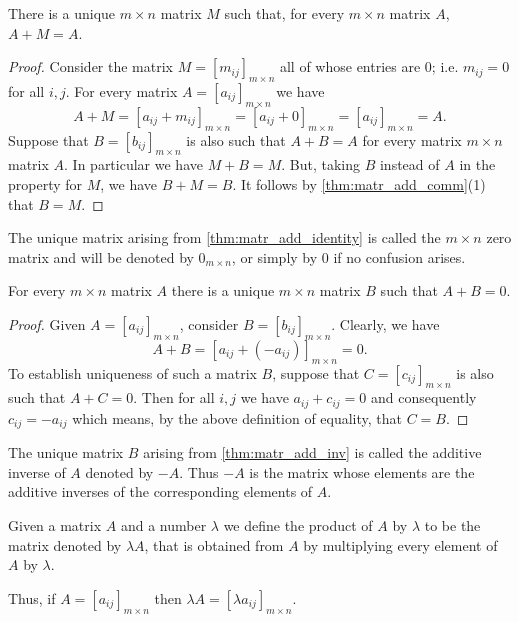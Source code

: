 \documentclass[10pt, a4paper]{article}
\begin{document}
\begin{theorem}\label{thm:matr_add_identity}
    There is a unique $m\times n$ matrix $M$ such that, for every $m\times n$ matrix $A$, $A + M = A$.
    \begin{proof}
        Consider the matrix $M = [m_{ij}]_{m\times n}$ all of whose entries are $0$; i.e. $m_{ij} = 0$ for all $i, j$. For every matrix $A = [a_{ij}]_{m\times n}$ we have
        \[
        A + M = [a_{ij} + m_{ij}]_{m\times n} = [a_{ij} + 0]_{m\times n} = [a_{ij}]_{m\times n} = A.
        \]
        Suppose that $B = [b_{ij}]_{m\times n}$ is also such that $A + B = A$ for every matrix $m\times n$ matrix $A$. In particular we have $M + B = M$. But, taking $B$ instead of $A$ in the property for $M$, we have $B + M = B$. It follows by \autoref{thm:matr_add_comm}(1) that $B = M$.
    \end{proof}
\end{theorem}

\begin{definition}
    The unique matrix arising from \autoref{thm:matr_add_identity} is called the $m\times n$ zero matrix and will be denoted by $0_{m\times n}$, or simply by $0$ if no confusion arises.
\end{definition}

\begin{theorem}\label{thm:matr_add_inv}
    For every $m\times n$ matrix $A$ there is a unique $m\times n$ matrix $B$ such that $A + B = 0$.

    \begin{proof}
        Given $A = [a_{ij}]_{m\times n}$, consider $B = [b_{ij}]_{m\times n}$. Clearly, we have
        \[
        A + B = [a_{ij} + (-a_{ij})]_{m\times n} = 0.
        \]
        To establish uniqueness of such a matrix $B$, suppose that $C = [c_{ij}]_{m\times n}$ is also such that $A + C = 0$. Then for all $i, j$ we have $a_{ij} + c_{ij} = 0$ and consequently $c_{ij} = -a_{ij}$ which means, by the above definition of equality, that $C = B$.
    \end{proof}
\end{theorem}

\begin{definition}
    The unique matrix $B$ arising from \autoref{thm:matr_add_inv} is called the additive inverse of $A$ denoted by $-A$. Thus $-A$ is the matrix whose elements are the additive inverses of the corresponding elements of $A$.
\end{definition}

\begin{definition}
    Given a matrix $A$ and a number $\lambda$ we define the product of $A$ by $\lambda$ to be the matrix denoted by $\lambda A$, that is obtained from $A$ by multiplying every element of $A$ by $\lambda$.

    Thus, if $A = [a_{ij}]_{m\times n}$ then $\lambda A = [\lambda a_{ij}]_{m\times n}$.
\end{definition}
\end{document}

